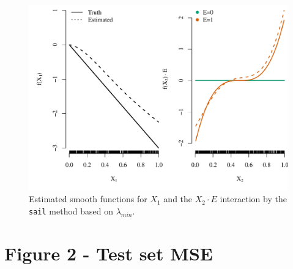 \documentclass[12pt,letter]{article}\usepackage[]{graphicx}\usepackage[]{color}
\newenvironment{knitrout}{}{} %
\begin{document}
\begin{knitrout}\scriptsize
{}\color{fgcolor}\begin{figure}[H]

{\centering \includegraphics[width=1\linewidth]{figure/toy-effects-1} 

}

\caption[Estimated smooth functions for $X_1$ and the $X_2 \cdot E$ interaction by the \texttt{sail} method based on $\lambda_{min}$]{Estimated smooth functions for $X_1$ and the $X_2 \cdot E$ interaction by the \texttt{sail} method based on $\lambda_{min}$.}\label{fig:toy-effects}
\end{figure}

\end{knitrout}



\section{Figure 2 - Test set MSE}
\end{document}
